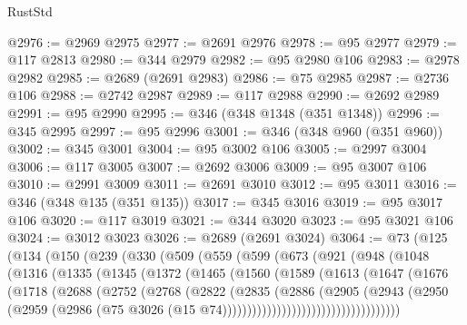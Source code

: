 \begin{lexlean}{RustStd}
\begin{coremodule}
{\begin{coremodule}
{{{{{{{{{{{{{{{{{{{{{{{{{{{{{{{{{{{{{{{@2976 := @2969 @2975
@2977 := @2691 @2976
@2978 := @95 @2977
@2979 := @117 @2813
@2980 := @344 @2979
@2982 := @95 @2980 @106
@2983 := @2978 @2982
@2985 := @2689 (@2691 @2983)
@2986 := @75 @2985
@2987 := @2736 @106
@2988 := @2742 @2987
@2989 := @117 @2988
@2990 := @2692 @2989
@2991 := @95 @2990
@2995 := @346 (@348 @1348 (@351 @1348))
@2996 := @345 @2995
@2997 := @95 @2996
@3001 := @346 (@348 @960 (@351 @960))
@3002 := @345 @3001
@3004 := @95 @3002 @106
@3005 := @2997 @3004
@3006 := @117 @3005
@3007 := @2692 @3006
@3009 := @95 @3007 @106
@3010 := @2991 @3009
@3011 := @2691 @3010
@3012 := @95 @3011
@3016 := @346 (@348 @135 (@351 @135))
@3017 := @345 @3016
@3019 := @95 @3017 @106
@3020 := @117 @3019
@3021 := @344 @3020
@3023 := @95 @3021 @106
@3024 := @3012 @3023
@3026 := @2689 (@2691 @3024)
@3064 := @73
    (@125
      (@134
        (@150
          (@239
            (@330
              (@509
                (@559
                  (@599
                    (@673
                      (@921
                        (@948
                          (@1048
                            (@1316
                              (@1335
                                (@1345
                                  (@1372
                                    (@1465
                                      (@1560
                                        (@1589
                                          (@1613
                                            (@1647
                                              (@1676
                                                (@1718
                                                  (@2688
                                                    (@2752
                                                      (@2768
                                                        (@2822
                                                          (@2835
                                                            (@2886
                                                              (@2905
                                                                (@2943
                                                                  (@2950
                                                                    (@2959
                                                                      (@2986
                                                                        (@75
                                                                          @3026
                                                                          (@15
                                                                            @74))))))))))))))))))))))))))))))))))))
}}}}}}}}}}}}}}}}}}}}}}}}}}}}}}}}}}}}}}}
\end{coremodule}}
\end{coremodule}
\end{lexlean}
